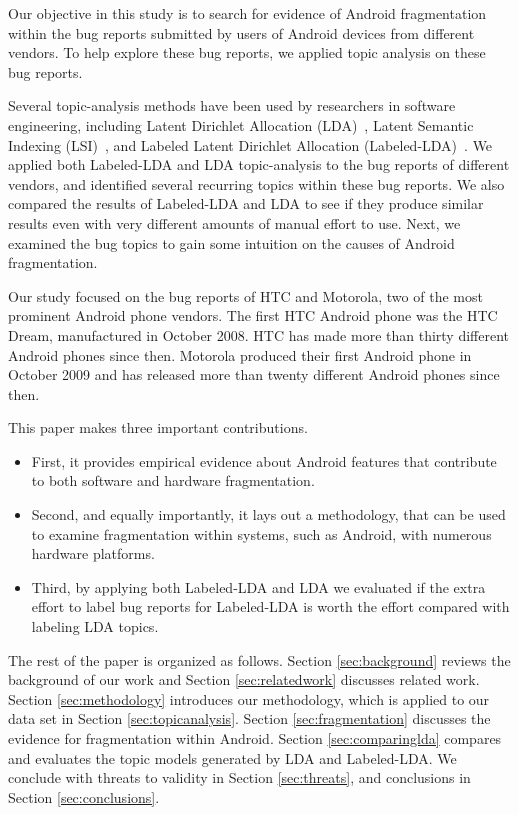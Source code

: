 \documentclass[10pt, conference, compsocconf]{IEEEtran}
\begin{document}
Our objective in this study is to search for evidence of Android
fragmentation within the bug reports submitted by users of Android
devices from different vendors. To help explore these bug reports, we
applied topic analysis on these bug reports.

Several topic-analysis methods have been used by researchers in
software engineering, including Latent Dirichlet Allocation
(LDA)~\cite{Asuncion:2010,Linstead:2009}, Latent Semantic Indexing
(LSI)~\cite{Marcus04aninformation}, and Labeled Latent Dirichlet
Allocation (Labeled-LDA)~\cite{labeledlda}.
We applied both Labeled-LDA and LDA topic-analysis to the bug reports
of different vendors, and identified several recurring topics within
these bug reports.
We also compared the results of Labeled-LDA and LDA to see if they
produce similar results even with very different amounts of
manual effort to use.
Next, we examined the bug topics to gain some intuition on the causes
of Android fragmentation.

Our study focused on the bug reports of HTC and Motorola, two of the
most prominent Android phone vendors. The first HTC Android phone was
the HTC Dream, manufactured in October 2008. HTC has made more than
thirty different Android phones since then. Motorola produced their
first Android phone in October 2009 and has released more than twenty
different Android phones since then. 
 
This paper makes three important contributions.
\begin{itemize}
\item First, it provides
empirical evidence about Android features that contribute to both software
and hardware fragmentation. 
\item Second, and equally importantly, it lays
out a methodology, that can be used to examine fragmentation within
systems, such as Android, with numerous hardware platforms. 
\item Third,
by applying both Labeled-LDA and LDA we evaluated if the extra effort
to label bug reports for Labeled-LDA is worth the effort compared with
labeling LDA topics.
\end{itemize}

The rest of the paper is organized as follows. Section \ref{sec:background} reviews the
background of our work and Section \ref{sec:relatedwork} discusses related work. Section \ref{sec:methodology}
introduces our methodology, which is applied to our data set in
Section \ref{sec:topicanalysis}. Section \ref{sec:fragmentation}
discusses the evidence for fragmentation within Android. Section \ref{sec:comparinglda} compares and evaluates the topic models generated
by LDA and Labeled-LDA. 
We conclude with threats to validity in Section \ref{sec:threats},
and conclusions in
Section \ref{sec:conclusions}.
\end{document}
